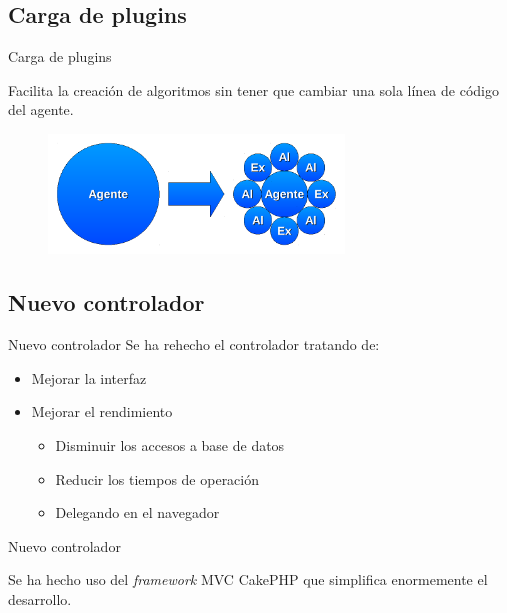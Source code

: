\documentclass[12pt]{beamer}
\begin{document}
\subsection{Carga de plugins}
\begin{frame}{Carga de plugins}
	\begin{center}
		Facilita la creación de algoritmos sin tener que cambiar una sola línea de código del agente.
		\begin{figure}
			\centering
			\includegraphics[width=0.7\textwidth]{images/nuevo_agente.pdf}
		\end{figure}

	\end{center}
\end{frame}

\subsection{Nuevo controlador}
\begin{frame}{Nuevo controlador}
	Se ha rehecho el controlador tratando de:
	\pause
	\begin{itemize}
		\item Mejorar la interfaz
		\item Mejorar el rendimiento
		\begin{itemize}
			\item Disminuir los accesos a base de datos
			\item Reducir los tiempos de operación
			\item Delegando en el navegador
		\end{itemize}
	\end{itemize}
\end{frame}

\begin{frame}{Nuevo controlador}
	\begin{center}
		Se ha hecho uso del \emph{framework} MVC CakePHP que simplifica enormemente el desarrollo.
	\end{center}
\end{frame}
\end{document}
